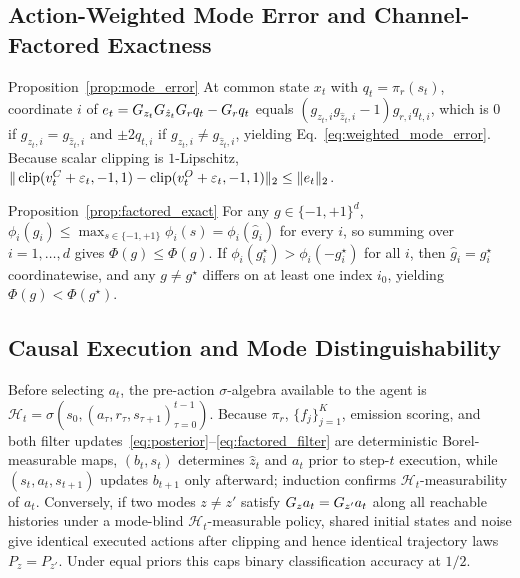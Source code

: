 \subsection{Action-Weighted Mode Error and Channel-Factored Exactness}

\begin{proofof}{Proposition~\ref{prop:mode_error}}
At common state $x_t$ with $q_t=\pi_r(s_t)$, coordinate $i$ of $e_t=G_{z_t}G_{\hat z_t}G_r q_t-G_r q_t$ equals $(g_{z_t,i}g_{\hat z_t,i}-1)g_{r,i}q_{t,i}$, which is $0$ if $g_{z_t,i}=g_{\hat z_t,i}$ and $\pm 2 q_{t,i}$ if $g_{z_t,i}\ne g_{\hat z_t,i}$, yielding Eq.~\eqref{eq:weighted_mode_error}. Because scalar clipping is $1$-Lipschitz, $\|\operatorname{clip}(v_t^C+\varepsilon_t,-1,1)-\operatorname{clip}(v_t^O+\varepsilon_t,-1,1)\|_2\le \|e_t\|_2$.
\end{proofof}

\begin{proofof}{Proposition~\ref{prop:factored_exact}}
For any $g\in\{-1,+1\}^d$, $\phi_i(g_i)\le \max_{s\in\{-1,+1\}}\phi_i(s)=\phi_i(\hat g_i)$ for every $i$, so summing over $i=1,\ldots,d$ gives $\Phi(g)\le\Phi(\hat g)$. If $\phi_i(g_i^\star)>\phi_i(-g_i^\star)$ for all $i$, then $\hat g_i=g_i^\star$ coordinatewise, and any $g\ne g^\star$ differs on at least one index $i_0$, yielding $\Phi(g)<\Phi(g^\star)$.
\end{proofof}

\subsection{Causal Execution and Mode Distinguishability}
\label{app:causal_identification}

Before selecting $a_t$, the pre-action $\sigma$-algebra available to the agent is $\mathcal{H}_t=\sigma(s_0,(a_\tau,r_\tau,s_{\tau+1})_{\tau=0}^{t-1})$. Because $\pi_r$, $\{f_j\}_{j=1}^K$, emission scoring, and both filter updates~\eqref{eq:posterior}--\eqref{eq:factored_filter} are deterministic Borel-measurable maps, $(b_t,s_t)$ determines $\hat z_t$ and $a_t$ prior to step-$t$ execution, while $(s_t,a_t,s_{t+1})$ updates $b_{t+1}$ only afterward; induction confirms $\mathcal{H}_t$-measurability of $a_t$. Conversely, if two modes $z\ne z'$ satisfy $G_z a_t=G_{z'} a_t$ along all reachable histories under a mode-blind $\mathcal{H}_t$-measurable policy, shared initial states and noise give identical executed actions after clipping and hence identical trajectory laws $P_z=P_{z'}$. Under equal priors this caps binary classification accuracy at $1/2$.

